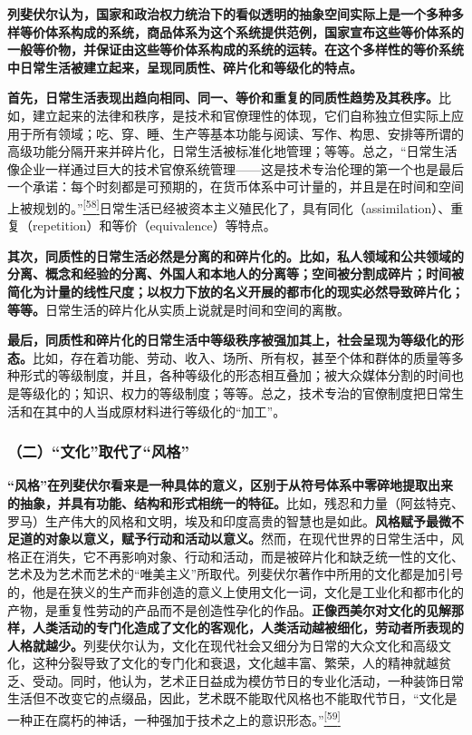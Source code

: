 \documentclass[UTF8, fontset = sourcesans, a4paper, oneside, zihao =
-4, scheme=chinese, no-math, space=true]{ctexbook}
\begin{document}
\textbf{列斐伏尔认为，国家和政治权力统治下的看似透明的抽象空间实际上是一个多种多样等价体系构成的系统，商品体系为这个系统提供范例，国家宣布这些等价体系的一般等价物，并保证由这些等价体系构成的系统的运转。在这个多样性的等价系统中日常生活被建立起来，呈现同质性、碎片化和等级化的特点。}

\textbf{首先，日常生活表现出趋向相同、同一、等价和重复的同质性趋势及其秩序。}比如，建立起来的法律和秩序，是技术和官僚理性的体现，它们自称独立但实际上应用于所有领域；吃、穿、睡、生产等基本功能与阅读、写作、构思、安排等所谓的高级功能分隔开来并碎片化，日常生活被标准化地管理；等等。总之，``日常生活像企业一样通过巨大的技术官僚系统管理------这是技术专治伦理的第一个也是最后一个承诺：每个时刻都是可预期的，在货币体系中可计量的，并且是在时间和空间上被规划的。''\protect\hypertarget{part0007_split_004.htmlux5cux23w58}{}{}\protect\hyperlink{part0007_split_004.htmlux5cux23m58}{\textsuperscript{{[}58{]}}}日常生活已经被资本主义殖民化了，具有同化（assimilation）、重复（repetition）和等价（equivalence）等特点。

\textbf{其次，同质性的日常生活必然是分离的和碎片化的。比如，私人领域和公共领域的分离、概念和经验的分离、外国人和本地人的分离等；空间被分割成碎片；时间被简化为计量的线性尺度；以权力下放的名义开展的都市化的现实必然导致碎片化；等等。}日常生活的碎片化从实质上说就是时间和空间的离散。

\textbf{最后，同质性和碎片化的日常生活中等级秩序被强加其上，社会呈现为等级化的形态。}比如，存在着功能、劳动、收入、场所、所有权，甚至个体和群体的质量等多种形式的等级制度，并且，各种等级化的形态相互叠加；被大众媒体分割的时间也是等级化的；知识、权力的等级制度；等等。总之，技术专治的官僚制度把日常生活和在其中的人当成原材料进行等级化的``加工''。

\subsubsection{\texorpdfstring{（二）``文化''取代了``风格''}{（二）文化取代了风格}}\label{part0007_split_004.htmlux5cux23d020}

\textbf{``风格''在列斐伏尔看来是一种具体的意义，区别于从符号体系中零碎地提取出来的抽象，并具有功能、结构和形式相统一的特征。}比如，残忍和力量（阿兹特克、罗马）生产伟大的风格和文明，埃及和印度高贵的智慧也是如此。\textbf{风格赋予最微不足道的对象以意义，赋予行动和活动以意义。}然而，在现代世界的日常生活中，风格正在消失，它不再影响对象、行动和活动，而是被碎片化和缺乏统一性的文化、艺术及为艺术而艺术的``唯美主义''所取代。列斐伏尔著作中所用的文化都是加引号的，他是在狭义的生产而非创造的意义上使用文化一词，文化是工业化和都市化的产物，是重复性劳动的产品而不是创造性孕化的作品。\textbf{正像西美尔对文化的见解那样，人类活动的专门化造成了文化的客观化，人类活动越被细化，劳动者所表现的人格就越少。}列斐伏尔认为，文化在现代社会又细分为日常的大众文化和高级文化，这种分裂导致了文化的专门化和衰退，文化越丰富、繁荣，人的精神就越贫乏、受动。同时，他认为，艺术正日益成为模仿节日的专业化活动，一种装饰日常生活但不改变它的点缀品，因此，艺术既不能取代风格也不能取代节日，``文化是一种正在腐朽的神话，一种强加于技术之上的意识形态。''\protect\hypertarget{part0007_split_004.htmlux5cux23w59}{}{}\protect\hyperlink{part0007_split_004.htmlux5cux23m59}{\textsuperscript{{[}59{]}}}
\end{document}

